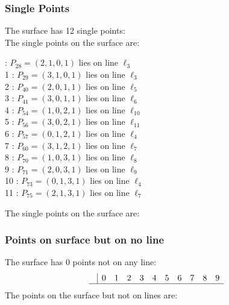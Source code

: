 \documentclass{article}
\begin{document}
{\subsubsection*{Single Points}
The surface has 12 single points:\\
The single points on the surface are:\\
\begin{multicols}{2}
 : $P_{28}=( 2, 1, 0, 1 )$ lies on line $\ell_{3}$\\
1 : $P_{29}=( 3, 1, 0, 1 )$ lies on line $\ell_{3}$\\
2 : $P_{40}=( 2, 0, 1, 1 )$ lies on line $\ell_{5}$\\
3 : $P_{41}=( 3, 0, 1, 1 )$ lies on line $\ell_{6}$\\
4 : $P_{54}=( 1, 0, 2, 1 )$ lies on line $\ell_{10}$\\
5 : $P_{56}=( 3, 0, 2, 1 )$ lies on line $\ell_{11}$\\
6 : $P_{57}=( 0, 1, 2, 1 )$ lies on line $\ell_{4}$\\
7 : $P_{60}=( 3, 1, 2, 1 )$ lies on line $\ell_{7}$\\
8 : $P_{70}=( 1, 0, 3, 1 )$ lies on line $\ell_{8}$\\
9 : $P_{71}=( 2, 0, 3, 1 )$ lies on line $\ell_{9}$\\
10 : $P_{73}=( 0, 1, 3, 1 )$ lies on line $\ell_{4}$\\
11 : $P_{75}=( 2, 1, 3, 1 )$ lies on line $\ell_{7}$\\
\end{multicols}
The single points on the surface are:\\
\subsubsection*{Points on surface but on no line}
The surface has 0 points not on any line:\\
$$
\begin{array}{r|*{10}{r}}
 & 0 & 1 & 2 & 3 & 4 & 5 & 6 & 7 & 8 & 9\\
\hline
\end{array}
$$
The points on the surface but not on lines are:\\
\begin{multicols}{2}
\noindent
\end{multicols}
}
\end{document}
